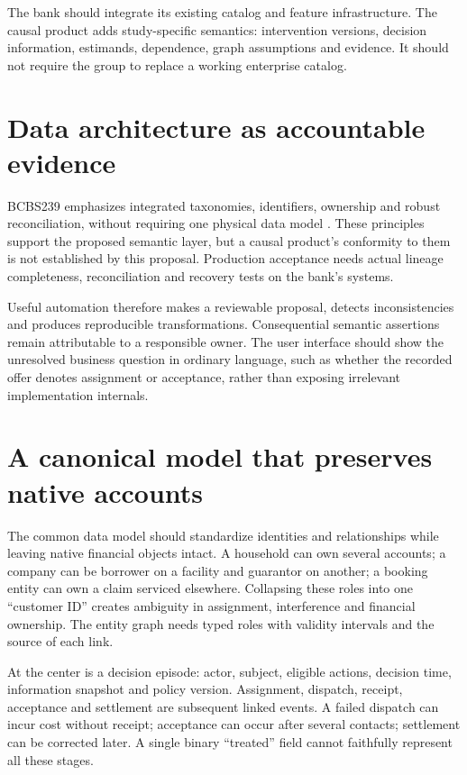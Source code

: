 The bank should integrate its existing catalog and feature infrastructure.
The causal product adds study-specific semantics: intervention versions,
decision information, estimands, dependence, graph assumptions and evidence.
It should not require the group to replace a working enterprise catalog.

\section{Data architecture as accountable evidence}
BCBS239 emphasizes integrated taxonomies, identifiers, ownership and robust
reconciliation, without requiring one physical data model
\citep{bcbs239}. These principles support the proposed semantic layer,
but a causal product's conformity to them is not established by this proposal.
Production acceptance needs actual lineage completeness, reconciliation and
recovery tests on the bank's systems.

Useful automation therefore makes a reviewable proposal, detects
inconsistencies and produces reproducible transformations. Consequential
semantic assertions remain attributable to a responsible owner. The user
interface should show the unresolved business question in ordinary language,
such as whether the recorded offer denotes assignment or acceptance, rather
than exposing irrelevant implementation internals.

\section{A canonical model that preserves native accounts}
The common data model should standardize identities and relationships while
leaving native financial objects intact. A household can own several accounts;
a company can be borrower on a facility and guarantor on another; a booking
entity can own a claim serviced elsewhere. Collapsing these roles into one
``customer ID'' creates ambiguity in assignment, interference and financial
ownership. The entity graph needs typed roles with validity intervals and
the source of each link.

At the center is a decision episode: actor, subject, eligible actions,
decision time, information snapshot and policy version. Assignment,
dispatch, receipt, acceptance and settlement are subsequent linked events.
A failed dispatch can incur cost without receipt; acceptance can occur after
several contacts; settlement can be corrected later. A single binary
``treated'' field cannot faithfully represent all these stages.

